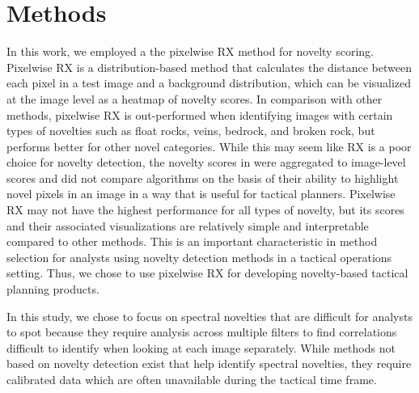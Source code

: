 \section{Methods}
In this work, we employed a the pixelwise RX method for novelty scoring.
Pixelwise RX is a distribution-based method that calculates the distance between each pixel in a test image and a background distribution, which can be visualized at the image level as a heatmap of novelty scores. 
In comparison with other methods, pixelwise RX is out-performed when identifying images with certain types of novelties such as float rocks, veins, bedrock, and broken rock, but performs better for other novel categories. 
While this may seem like RX is a poor choice for novelty detection, the novelty scores in \cite{kerner2020comparison} were aggregated to image-level scores and did not compare algorithms on the basis of their ability to highlight novel pixels in an image in a way that is useful for tactical planners. 
Pixelwise RX may not have the highest performance for all types of novelty, but its scores and their associated visualizations are relatively simple and interpretable compared to other methods. 
This is an important characteristic in method selection for analysts using novelty detection methods in a tactical operations setting. Thus, we chose to use pixelwise RX for developing novelty-based tactical planning products. 

In this study, we chose to focus on spectral novelties that are difficult for analysts to spot because they require analysis across multiple filters to find correlations difficult to identify when looking at each image separately. 
While methods not based on novelty detection exist that help identify spectral novelties, they require calibrated data which are often unavailable during the tactical time frame. 


